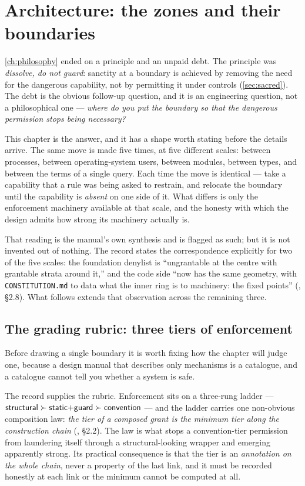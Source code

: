 \chapter{Architecture: the zones and their boundaries}
\label{ch:architecture}

\autoref{ch:philosophy} ended on a principle and an unpaid debt. The principle was
\emph{dissolve, do not guard}: sanctity at a boundary is achieved by removing the
need for the dangerous capability, not by permitting it under controls
(\autoref{sec:sacred}). The debt is the obvious follow-up question, and it is an
engineering question, not a philosophical one --- \emph{where do you put the
boundary so that the dangerous permission stops being necessary?}

This chapter is the answer, and it has a shape worth stating before the details
arrive. The same move is made five times, at five different scales: between
processes, between operating-system users, between modules, between types, and
between the terms of a single query. Each time the move is identical --- take a
capability that a rule was being asked to restrain, and relocate the boundary until
the capability is \emph{absent} on one side of it. What differs is only the
enforcement machinery available at that scale, and the honesty with which the
design admits how strong its machinery actually is.

That reading is the manual's own synthesis and is flagged as such; but it is not
invented out of nothing. The record states the correspondence explicitly for two of
the five scales: the foundation denylist is ``ungrantable at the centre with
grantable strata around it,'' and the code side ``now has the same geometry, with
\texttt{CONSTITUTION.md} to data what the inner ring is to machinery: the fixed
points'' (, \S 2.8). What follows extends that
observation across the remaining three.

\section{The grading rubric: three tiers of enforcement}
\label{sec:tiers}

Before drawing a single boundary it is worth fixing how the chapter will judge one,
because a design manual that describes only mechanisms is a catalogue, and a
catalogue cannot tell you whether a system is safe.

The record supplies the rubric. Enforcement sits on a three-rung ladder ---
$\textsf{structural}{} \succ \textsf{static+guard}{} \succ \textsf{convention}{}$ --- and the ladder carries one
non-obvious composition law: \emph{the tier of a composed grant is the minimum tier
along the construction chain} (, \S 2.2). The law is
what stops a convention-tier permission from laundering itself through a
structural-looking wrapper and emerging apparently strong. Its practical
consequence is that the tier is an \emph{annotation on the whole chain}, never a
property of the last link, and it must be recorded honestly at each link or the
minimum cannot be computed at all.

